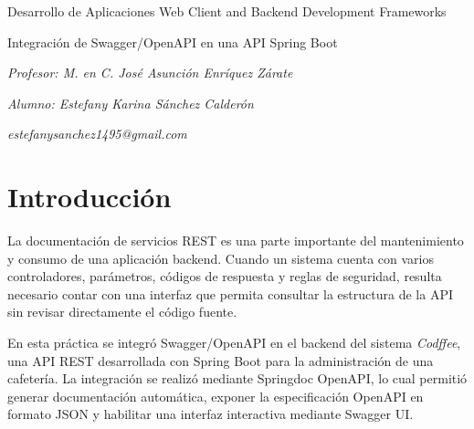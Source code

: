 \documentclass[10pt,a4paper]{article}
\begin{document}
\begin{titlepage}
    \centering
    {\huge\bfseries\color{colorIPN}{Instituto Politécnico Nacional}\par}
    {\Large\bfseries\color{colorESCOM}{Escuela Superior de Cómputo}\par}
    \vspace{1cm}
    {\huge\Large\color{colorIPN}
    {Desarrollo de Aplicaciones Web Client and Backend Development Frameworks}\par}
    \vspace{1.5cm}
    {\huge\Large\color{colorESCOM}
    {Integración de Swagger/OpenAPI en una API Spring Boot}\par}
    \vspace{2cm}
    {\Large\itshape\color{colorIPN}
    {Profesor: M. en C. José Asunción Enríquez Zárate}\par}
    \vspace{2cm}
    {\Large\itshape\color{colorIPN}
    {Alumno: Estefany Karina Sánchez Calderón}\par}
    {\Large\itshape\color{colorIPN}
    {estefanysanchez1495@gmail.com}\par}
    {\Large\itshape\color{colorIPN}{7CM3}\par}
    \vfill
    {\large\color{colorIPN}{\today}\par}
    \vfill
\end{titlepage}

\tableofcontents
\pagebreak
{}

\section{Introducción}

La documentación de servicios REST es una parte importante del mantenimiento y consumo de una aplicación backend. Cuando un sistema cuenta con varios controladores, parámetros, códigos de respuesta y reglas de seguridad, resulta necesario contar con una interfaz que permita consultar la estructura de la API sin revisar directamente el código fuente.

En esta práctica se integró Swagger/OpenAPI en el backend del sistema \textit{Codffee}, una API REST desarrollada con Spring Boot para la administración de una cafetería. La integración se realizó mediante Springdoc OpenAPI, lo cual permitió generar documentación automática, exponer la especificación OpenAPI en formato JSON y habilitar una interfaz interactiva mediante Swagger UI.
\end{document}

